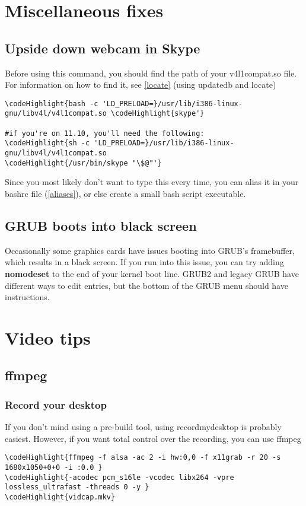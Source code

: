 \documentclass[12pt,a4paper]{article}
\begin{document}
\section{Miscellaneous fixes}
\subsection{Upside down webcam in Skype}
Before using this command, you should find the path of your v4l1compat.so file.  For information on how to find it, see \hyperref[locate]{\ref*{locate}} (using updatedb and locate)
\begin{Verbatim}[commandchars=\\\{\}]
\codeHighlight{bash -c 'LD_PRELOAD=}/usr/lib/i386-linux-gnu/libv4l/v4l1compat.so \codeHighlight{skype'}

#if you're on 11.10, you'll need the following:
\codeHighlight{sh -c 'LD_PRELOAD=}/usr/lib/i386-linux-gnu/libv4l/v4l1compat.so 
\codeHighlight{/usr/bin/skype "\$@"'}
\end{Verbatim}
Since you most likely don't want to type this every time, you can alias it in your bashrc file (\hyperref[aliases]{\ref*{aliases}}), or else create a small bash script executable.

\subsection{GRUB boots into black screen}
Occasionally some graphics cards have issues booting into GRUB's framebuffer, which results in a black screen.  If you run into this issue, you can try adding \textbf{nomodeset} to the end of your kernel boot line.  GRUB2 and legacy GRUB have different ways to edit entries, but the bottom of the GRUB menu should have instructions.

\section{Video tips}
\subsection{ffmpeg}
\subsubsection{Record your desktop}
If you don't mind using a pre-build tool, using recordmydesktop is probably easiest.  However, if you want total control over the recording, you can use ffmpeg
\begin{Verbatim}[commandchars=\\\{\}]
\codeHighlight{ffmpeg -f alsa -ac 2 -i hw:0,0 -f x11grab -r 20 -s 1680x1050+0+0 -i :0.0 }
\codeHighlight{-acodec pcm_s16le -vcodec libx264 -vpre lossless_ultrafast -threads 0 -y }
\codeHighlight{vidcap.mkv}
\end{Verbatim}
\end{document}
